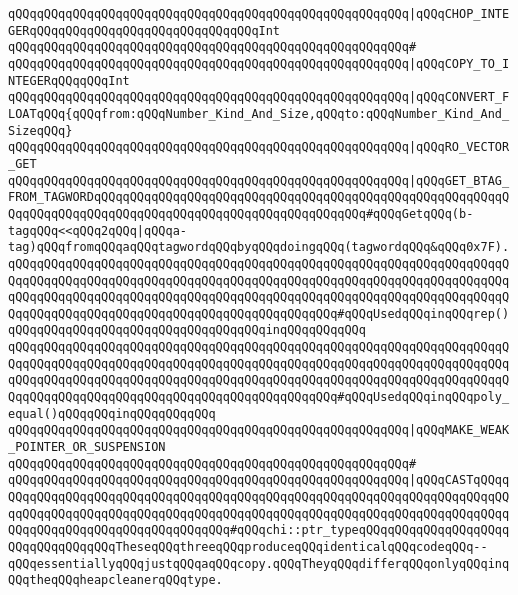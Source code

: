 \verb|qQQqqQQqqQQqqQQqqQQqqQQqqQQqqQQqqQQqqQQqqQQqqQQqqQQqqQQq|\verb#|qQQqCHOP_INTEGERqQQqqQQqqQQqqQQqqQQqqQQqqQQqqQQqInt#\newline
\verb|qQQqqQQqqQQqqQQqqQQqqQQqqQQqqQQqqQQqqQQqqQQqqQQqqQQqqQQq#|\newline
\verb|qQQqqQQqqQQqqQQqqQQqqQQqqQQqqQQqqQQqqQQqqQQqqQQqqQQqqQQq|\verb#|qQQqCOPY_TO_INTEGERqQQqqQQqInt#\newline
\verb|qQQqqQQqqQQqqQQqqQQqqQQqqQQqqQQqqQQqqQQqqQQqqQQqqQQqqQQq|\verb#|qQQqCONVERT_FLOATqQQq{qQQqfrom:qQQqNumber_Kind_And_Size,qQQqto:qQQqNumber_Kind_And_SizeqQQq}#\newline
\verb|qQQqqQQqqQQqqQQqqQQqqQQqqQQqqQQqqQQqqQQqqQQqqQQqqQQqqQQq|\verb#|qQQqRO_VECTOR_GET#\newline
\newline
\verb|qQQqqQQqqQQqqQQqqQQqqQQqqQQqqQQqqQQqqQQqqQQqqQQqqQQqqQQq|\verb#|qQQqGET_BTAG_FROM_TAGWORDqQQqqQQqqQQqqQQqqQQqqQQqqQQqqQQqqQQqqQQqqQQqqQQqqQQqqQQqqQQqqQQqqQQqqQQqqQQqqQQqqQQqqQQqqQQqqQQqqQQqqQQqqQQq#\verb|#qQQqGetqQQq(b-tagqQQq<<qQQq2qQQq|\verb#|qQQqa-tag)qQQqfromqQQqaqQQqtagwordqQQqbyqQQqdoingqQQq(tagwordqQQq&qQQq0x7F).#\newline
\verb|qQQqqQQqqQQqqQQqqQQqqQQqqQQqqQQqqQQqqQQqqQQqqQQqqQQqqQQqqQQqqQQqqQQqqQQqqQQqqQQqqQQqqQQqqQQqqQQqqQQqqQQqqQQqqQQqqQQqqQQqqQQqqQQqqQQqqQQqqQQqqQQqqQQqqQQqqQQqqQQqqQQqqQQqqQQqqQQqqQQqqQQqqQQqqQQqqQQqqQQqqQQqqQQqqQQqqQQqqQQqqQQqqQQqqQQqqQQqqQQqqQQqqQQqqQQqqQQq#qQQqUsedqQQqinqQQqrep()qQQqqQQqqQQqqQQqqQQqqQQqqQQqqQQqqQQqinqQQqqQQqqQQq|\newline
\verb|qQQqqQQqqQQqqQQqqQQqqQQqqQQqqQQqqQQqqQQqqQQqqQQqqQQqqQQqqQQqqQQqqQQqqQQqqQQqqQQqqQQqqQQqqQQqqQQqqQQqqQQqqQQqqQQqqQQqqQQqqQQqqQQqqQQqqQQqqQQqqQQqqQQqqQQqqQQqqQQqqQQqqQQqqQQqqQQqqQQqqQQqqQQqqQQqqQQqqQQqqQQqqQQqqQQqqQQqqQQqqQQqqQQqqQQqqQQqqQQqqQQqqQQqqQQqqQQq#qQQqUsedqQQqinqQQqpoly_equal()qQQqqQQqinqQQqqQQqqQQq|\newline
\verb|qQQqqQQqqQQqqQQqqQQqqQQqqQQqqQQqqQQqqQQqqQQqqQQqqQQqqQQq|\verb#|qQQqMAKE_WEAK_POINTER_OR_SUSPENSION#\newline
\verb|qQQqqQQqqQQqqQQqqQQqqQQqqQQqqQQqqQQqqQQqqQQqqQQqqQQqqQQq#|\newline
\verb|qQQqqQQqqQQqqQQqqQQqqQQqqQQqqQQqqQQqqQQqqQQqqQQqqQQqqQQq|\verb#|qQQqCASTqQQqqQQqqQQqqQQqqQQqqQQqqQQqqQQqqQQqqQQqqQQqqQQqqQQqqQQqqQQqqQQqqQQqqQQqqQQqqQQqqQQqqQQqqQQqqQQqqQQqqQQqqQQqqQQqqQQqqQQqqQQqqQQqqQQqqQQqqQQqqQQqqQQqqQQqqQQqqQQqqQQqqQQqqQQqqQQq#\verb|#qQQqchi::ptr_typeqQQqqQQqqQQqqQQqqQQqqQQqqQQqqQQqqQQqTheseqQQqthreeqQQqproduceqQQqidenticalqQQqcodeqQQq--qQQqessentiallyqQQqjustqQQqaqQQqcopy.qQQqTheyqQQqdifferqQQqonlyqQQqinqQQqtheqQQqheapcleanerqQQqtype.|\newline
